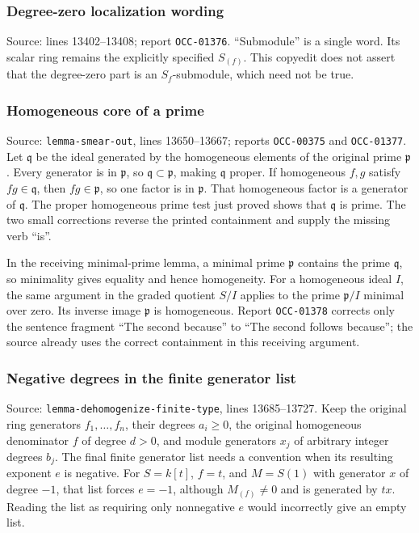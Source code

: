 \subsubsection{Degree-zero localization wording}\label{algebra-proof-002-degree-zero-localization-wording}

Source: lines 13402--13408; report \texttt{OCC-01376}. ``Submodule'' is a single word. Its scalar ring remains the explicitly specified \(S_{(f)}\). This copyedit does not assert that the degree-zero part is an \(S_f\)-submodule, which need not be true.

\subsubsection{Homogeneous core of a prime}\label{algebra-proof-002-homogeneous-core-of-a-prime}

Source: \texttt{lemma-smear-out}, lines 13650--13667; reports \texttt{OCC-00375} and \texttt{OCC-01377}. Let \(\mathfrak q\) be the ideal generated by the homogeneous elements of the original prime \(\mathfrak p\). Every generator is in \(\mathfrak p\), so \(\mathfrak q\subset\mathfrak p\), making \(\mathfrak q\) proper. If homogeneous \(f,g\) satisfy \(fg\in\mathfrak q\), then \(fg\in\mathfrak p\), so one factor is in \(\mathfrak p\). That homogeneous factor is a generator of \(\mathfrak q\). The proper homogeneous prime test just proved shows that \(\mathfrak q\) is prime. The two small corrections reverse the printed containment and supply the missing verb ``is''.

In the receiving minimal-prime lemma, a minimal prime \(\mathfrak p\) contains the prime \(\mathfrak q\), so minimality gives equality and hence homogeneity. For a homogeneous ideal \(I\), the same argument in the graded quotient \(S/I\) applies to the prime \(\mathfrak p/I\) minimal over zero. Its inverse image \(\mathfrak p\) is homogeneous. Report \texttt{OCC-01378} corrects only the sentence fragment ``The second because'' to ``The second follows because''; the source already uses the correct containment in this receiving argument.

\subsubsection{Negative degrees in the finite generator list}\label{algebra-proof-002-negative-degrees-in-the-finite-generator-list}

Source: \texttt{lemma-dehomogenize-finite-type}, lines 13685--13727. Keep the original ring generators \(f_1,\ldots,f_n\), their degrees \(a_i\geq0\), the original homogeneous denominator \(f\) of degree \(d>0\), and module generators \(x_j\) of arbitrary integer degrees \(b_j\). The final finite generator list needs a convention when its resulting exponent \(e\) is negative. For \(S=k[t]\), \(f=t\), and \(M=S(1)\) with generator \(x\) of degree \(-1\), that list forces \(e=-1\), although \(M_{(f)}\ne0\) and is generated by \(tx\). Reading the list as requiring only nonnegative \(e\) would incorrectly give an empty list.

